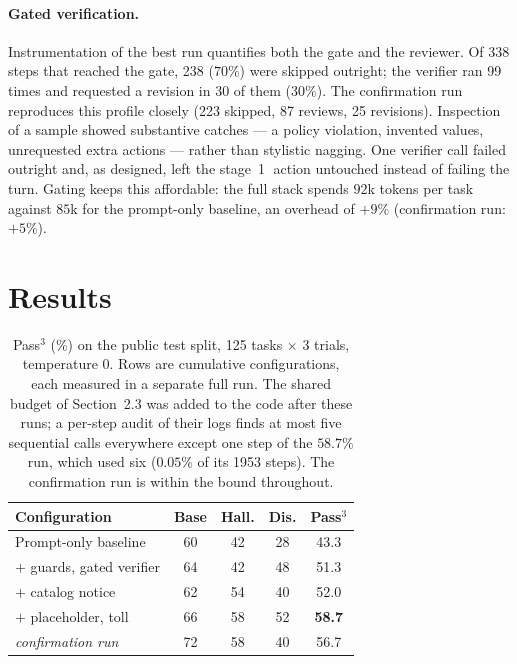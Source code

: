 \documentclass{article}
\begin{document}
\paragraph{Gated verification.}
Instrumentation of the best run quantifies both the gate and the
reviewer. Of 338 steps that reached the gate, 238 ($70\%$) were skipped
outright; the verifier ran 99 times and requested a revision in 30 of
them ($30\%$). The confirmation run reproduces this profile closely
(223 skipped, 87 reviews, 25 revisions). Inspection of a sample showed
substantive catches --- a policy violation, invented values,
unrequested extra actions --- rather than stylistic nagging. One
verifier call failed outright and, as designed, left the
stage~\textcircled{1} action untouched instead of failing the turn.
Gating keeps this affordable: the full stack spends $92$k tokens per
task against $85$k for the prompt-only baseline, an overhead of $+9\%$
(confirmation run: $+5\%$).

\section{Results}

\begin{table}[t]
\centering
\begin{tabular}{@{}lcccc@{}}
\toprule
Configuration & Base & Hall. & Dis. & \textbf{Pass$^3$} \\
\midrule
Prompt-only baseline      & 60 & 42 & 28 & 43.3 \\
$+$ guards, gated verifier & 64 & 42 & 48 & 51.3 \\
$+$ catalog notice        & 62 & 54 & 40 & 52.0 \\
$+$ placeholder, toll     & 66 & 58 & 52 & \textbf{58.7} \\
\midrule
\emph{confirmation run}   & 72 & 58 & 40 & 56.7 \\
\bottomrule
\end{tabular}
\caption{Pass$^3$ (\%) on the public test split, 125 tasks
$\times$ 3 trials, temperature $0$. Rows are cumulative
configurations, each measured in a separate full run. The shared
budget of Section~2.3 was added to the code after these runs; a
per-step audit of their logs finds at most five sequential calls
everywhere except one step of the $58.7\%$ run, which used six
($0.05\%$ of its 1953 steps). The confirmation run is within the bound
throughout.}
\label{tab:results}
\end{table}
\end{document}

